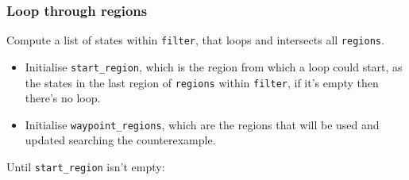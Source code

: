 \documentclass[11pt]{article}
\newcommand{\minline}[1]{{\footnotesize \texttt{#1}}}
\begin{document}
\subsubsection{Loop through regions}

Compute a list of states within \minline{filter}, that loops and intersects
all \minline{regions}.
\begin{itemize}
	\item Initialise \minline{start_region}, which is the region from which a
	      loop could start, as the states in the last region of
	      \minline{regions} within \minline{filter}, if it's empty then there's
	      no loop.
	\item Initialise \minline{waypoint_regions}, which are the regions that will
	      be used and updated searching the counterexample.
\end{itemize}
Until \minline{start_region} isn't empty:
\end{document}
